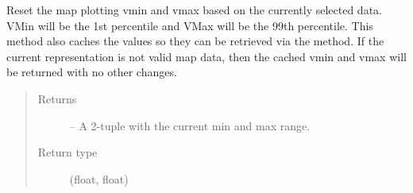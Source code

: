 \documentclass[letterpaper,10pt,english]{sphinxmanual}
\begin{document}
\begin{fulllineitems}
\begin{fulllineitems}
\label{\detokenize{xanespy:xanespy.qt_frameset_presenter.QtFramesetPresenter.reset_map_range}}
Reset the map plotting vmin and vmax based on the currently
selected data. VMin will be the 1st percentile and VMax will
be the 99th percentile. This method also caches the values so
they can be retrieved via the  method. If the
current representation is not valid map data, then the cached
vmin and vmax will be returned with no other changes.
\begin{quote}\begin{description}
\item[{Returns}] \leavevmode
{} -- A 2-tuple with the current min and max range.

\item[{Return type}] \leavevmode
(float, float)

\end{description}\end{quote}

\end{fulllineitems}


\begin{fulllineitems}
\label{\detokenize{xanespy:xanespy.qt_frameset_presenter.QtFramesetPresenter.set_frame_vmax}}
\end{fulllineitems}


\begin{fulllineitems}
\label{\detokenize{xanespy:xanespy.qt_frameset_presenter.QtFramesetPresenter.set_frame_vmin}}
\end{fulllineitems}


\begin{fulllineitems}
\label{\detokenize{xanespy:xanespy.qt_frameset_presenter.QtFramesetPresenter.set_map_cursor}}
\end{fulllineitems}


\end{fulllineitems}
\end{document}
